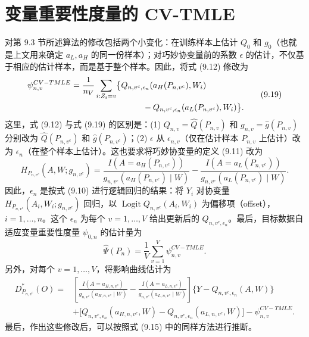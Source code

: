 \section{变量重要性度量的 CV-TMLE}

对第 9.3 节所述算法的修改包括两个小变化：在训练样本上估计 $Q_0$ 和 $g_0$（也就是上文用来确定 $a_L,a_H$ 的同一份样本）；对巧妙协变量前的系数 $\epsilon$ 的估计，不仅基于相应的估计样本，而是基于整个样本。因此，将式 (9.12) 修改为
\begin{equation}
\begin{aligned}
\psi^{CV-TMLE}_{n,v}
={}&\frac1{n_V}\sum_{i:Z_i=v}\bigl\{Q_{n,v^c,\epsilon_n}(a_H(P_{n,v^c}),W_i)\\
&\hspace{7.3em}-Q_{n,v^c,\epsilon_n}(a_L(P_{n,v^c}),W_i)\bigr\}.
\end{aligned}
\tag{9.19}
\end{equation}
这里，式 (9.12) 与式 (9.19) 的区别是：(1) $Q_{n,v}=\hat Q(P_{n,v})$ 和 $g_{n,v}=\hat g(P_{n,v})$ 分别改为 $\hat Q(P_{n,v^c})$ 和 $\hat g(P_{n,v^c})$；(2) $\epsilon$ 从 $\epsilon_{n,v}$（仅在估计样本 $P_{n,v}$ 上估计）改为 $\epsilon_n$（在整个样本上估计）。这也要求将巧妙协变量的定义 (9.11) 改为
\begin{equation}
H_{P_{n,v^c}}(A,W;g_{n,v^c})
=\frac{I(A=a_H(P_{n,v^c}))}{g_{n,v^c}(a_H(P_{n,v^c})\mid W)}
-\frac{I(A=a_L(P_{n,v^c}))}{g_{n,v^c}(a_L(P_{n,v^c})\mid W)}.
\tag{9.20}
\end{equation}
因此，$\epsilon_n$ 是按式 (9.10) 进行逻辑回归的结果：将 $Y_i$ 对协变量 $H_{P_{n,v^c}}(A_i,W_i;g_{n,v^c})$ 回归，以 $\operatorname{Logit}Q_{n,v^c}(A_i,W_i)$ 为偏移项（offset），$i=1,\ldots,n$。这个 $\epsilon_n$ 为每个 $v=1,\ldots,V$ 给出更新后的 $Q_{n,v^c,\epsilon_n}$。最后，目标数据自适应变量重要性度量 $\psi_{0,n}$ 的估计量为
\begin{equation}
\hat\Psi(P_n)=\frac1V\sum_{v=1}^V\psi^{CV-TMLE}_{n,v}.
\tag{9.21}
\end{equation}
另外，对每个 $v=1,\ldots,V$，将影响曲线估计为
\[
\begin{aligned}
D^*_{P_{n,v^c}}(O)
={}&\left[\frac{I(A=a_{H,n,v^c})}{g_{n,v^c}(a_{H,n,v^c}\mid W)}
-\frac{I(A=a_{L,n,v^c})}{g_{n,v^c}(a_{L,n,v^c}\mid W)}\right]
\{Y-Q_{n,v^c,\epsilon_n}(A,W)\}\\
&+\bigl[Q_{n,v^c,\epsilon_n}(a_{H,n,v^c},W)
-Q_{n,v^c,\epsilon_n}(a_{L,n,v^c},W)\bigr]
-\psi^{CV-TMLE}_{n,v}.
\end{aligned}
\]
最后，作出这些修改后，可以按照式 (9.15) 中的同样方法进行推断。

